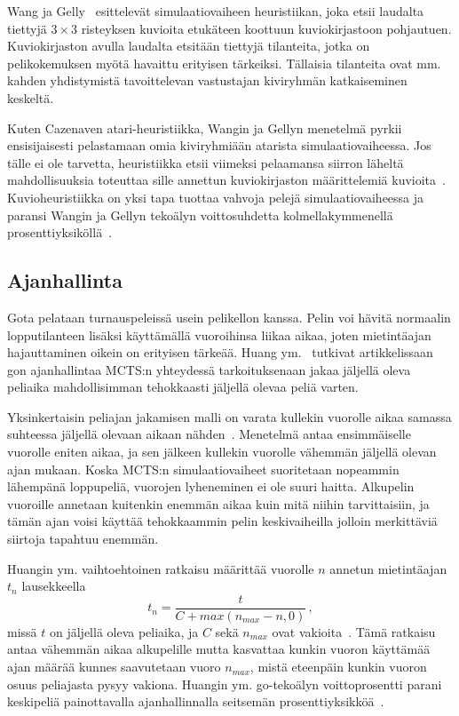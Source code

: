 \documentclass[12pt,finnish]{tktltiki2}
\theoremstyle{definition}
\theoremstyle{remark}
\begin{document}
Wang ja Gelly~\cite{wanggelly} esittelevät simulaatiovaiheen heuristiikan, joka etsii laudalta tiettyjä $3\times 3$ risteyksen kuvioita etukäteen koottuun kuviokirjastoon pohjautuen. Kuviokirjaston avulla laudalta etsitään tiettyjä tilanteita, jotka on pelikokemuksen myötä havaittu erityisen tärkeiksi. Tällaisia tilanteita ovat mm. kahden yhdistymistä tavoittelevan vastustajan kiviryhmän katkaiseminen keskeltä.

Kuten Cazenaven atari-heuristiikka, Wangin ja Gellyn menetelmä pyrkii ensisijaisesti pelastamaan omia kiviryhmiään atarista simulaatiovaiheessa. Jos tälle ei ole tarvetta, heuristiikka etsii viimeksi pelaamansa siirron läheltä mahdollisuuksia toteuttaa sille annettun kuviokirjaston määrittelemiä kuvioita~\cite{wanggelly}. Kuvioheuristiikka on yksi tapa tuottaa vahvoja pelejä simulaatiovaiheessa ja paransi Wangin ja Gellyn tekoälyn voittosuhdetta kolmellakymmenellä prosenttiyksiköllä~\cite{wanggelly}.


\subsection{Ajanhallinta}

Gota pelataan turnauspeleissä usein pelikellon kanssa. Pelin voi hävitä normaalin lopputilanteen lisäksi käyttämällä vuoroihinsa liikaa aikaa, joten mietintäajan hajauttaminen oikein on erityisen tärkeää. Huang ym.~\cite{huang} tutkivat artikkelissaan gon ajanhallintaa MCTS:n yhteydessä tarkoituksenaan jakaa jäljellä oleva peliaika mahdollisimman tehokkaasti jäljellä olevaa peliä varten.

Yksinkertaisin peliajan jakamisen malli on varata kullekin vuorolle aikaa samassa suhteessa jäljellä olevaan aikaan nähden~\cite{huang}. Menetelmä antaa ensimmäiselle vuorolle eniten aikaa, ja sen jälkeen kullekin vuorolle vähemmän jäljellä olevan ajan mukaan. Koska MCTS:n simulaatiovaiheet suoritetaan nopeammin lähempänä loppupeliä, vuorojen lyheneminen ei ole suuri haitta. Alkupelin vuoroille annetaan kuitenkin enemmän aikaa kuin mitä niihin tarvittaisiin, ja tämän ajan voisi käyttää tehokkaammin pelin keskivaiheilla jolloin merkittäviä siirtoja tapahtuu enemmän.

Huangin ym. vaihtoehtoinen ratkaisu määrittää vuorolle $n$ annetun mietintäajan $t_n$ lausekkeella
\begin{equation}
t_n = \frac{t}{C + max(n_{max} - n, 0)}\,,
\end{equation}
missä $t$ on jäljellä oleva peliaika, ja $C$ sekä $n_{max}$ ovat vakioita~\cite{huang}. Tämä ratkaisu antaa vähemmän aikaa alkupelille mutta kasvattaa kunkin vuoron käyttämää ajan määrää kunnes saavutetaan vuoro $n_{max}$, mistä eteenpäin kunkin vuoron osuus peliajasta pysyy vakiona. Huangin ym. go-tekoälyn voittoprosentti parani keskipeliä painottavalla ajanhallinnalla seitsemän prosenttiyksikköä~\cite{huang}.
\end{document}
